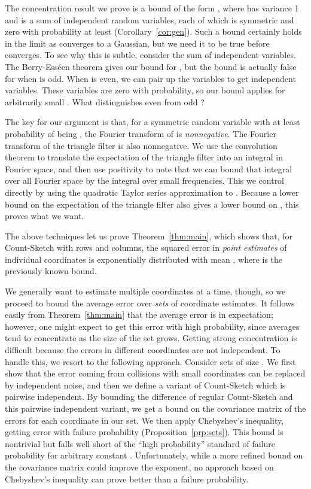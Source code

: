 \documentclass[letterpaper,11pt]{article}
\begin{document}
The concentration result we prove is a bound of the form , where  has variance 1 and is a sum
of independent random variables, each of which is symmetric and zero
with probability at least  (Corollary~\ref{cor:gen}).
Such a bound certainly holds in the limit as
 converges to a Gaussian, but we need it to be true before 
converges. To see why this is subtle, consider the sum of 
independent  variables.  The Berry-Ess\'een theorem
gives our bound for , but the bound is actually
false for  when  is odd.  When  is even,
we can pair up the variables to get  independent
 variables.  These variables are zero with 
probability, so our bound applies for arbitrarily small .
What distinguishes even  from odd ?

The key for our argument is that, for a symmetric random variable 
with at least  probability of being , the Fourier transform
of  is \emph{nonnegative}.
The Fourier transform of the triangle filter 
is also nonnegative.  We use the convolution theorem to translate
the expectation of the triangle filter into an integral in Fourier
space, and then use positivity to note that we can bound that
integral over all Fourier space by the integral over small
frequencies.  This we control directly by using the quadratic Taylor series
approximation to .  Because a lower bound on
the expectation of the triangle filter also gives a lower bound
on , this proves what we want.

The above techniques let us prove Theorem~\ref{thm:main}, which shows
that, for Count-Sketch with  rows and  columns, the
squared error in \emph{point estimates} of individual coordinates 
is exponentially distributed with mean , where 
is the previously known bound.

We generally want to estimate multiple coordinates at a time, though,
so we proceed to bound the average error over \emph{sets} of
coordinate estimates.  It follows easily from Theorem~\ref{thm:main}
that the average error is  in expectation; however, one
might expect to get this error with high probability, since averages
tend to concentrate as the size of the set grows.  Getting strong
concentration is difficult because the errors in different coordinates
are not independent.  To handle this, we resort to the following
approach.  Consider sets of size .  We first show that the error
coming from collisions with small coordinates can be replaced by
independent noise, and then we define a variant of Count-Sketch which
is pairwise independent.  By bounding the difference of regular
Count-Sketch and this pairwise independent variant, we get a bound on the
covariance matrix of the errors for each coordinate in our set.
We then apply Chebyshev's inequality, getting 
error with failure probability 
(Proposition~\ref{prp:sets}).  This bound is
nontrivial but falls well short of the ``high probability'' standard
of  failure probability for arbitrary constant .
Unfortunately, while a more refined bound on the covariance matrix
could improve the exponent, no approach based on Chebyshev's inequality
can prove better than a  failure probability.
\end{document}
